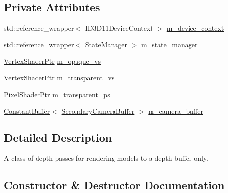 \subsection*{Private Attributes}
\begin{DoxyCompactItemize}
\item 
std\+::reference\+\_\+wrapper$<$ I\+D3\+D11\+Device\+Context $>$ \hyperlink{classmage_1_1rendering_1_1_depth_pass_a304b434841fb8a8b443df0e790630023}{m\+\_\+device\+\_\+context}
\item 
std\+::reference\+\_\+wrapper$<$ \hyperlink{classmage_1_1rendering_1_1_state_manager}{State\+Manager} $>$ \hyperlink{classmage_1_1rendering_1_1_depth_pass_a86c299c8b6ec689c83c60451fd988a35}{m\+\_\+state\+\_\+manager}
\item 
\hyperlink{namespacemage_1_1rendering_aaf704b9c54a4181f4950a1761de69dda}{Vertex\+Shader\+Ptr} \hyperlink{classmage_1_1rendering_1_1_depth_pass_a101f60b0363f79f9d349ea95e0efabe5}{m\+\_\+opaque\+\_\+vs}
\item 
\hyperlink{namespacemage_1_1rendering_aaf704b9c54a4181f4950a1761de69dda}{Vertex\+Shader\+Ptr} \hyperlink{classmage_1_1rendering_1_1_depth_pass_ab505e6b33ab449c2b7914d93e728eabb}{m\+\_\+transparent\+\_\+vs}
\item 
\hyperlink{namespacemage_1_1rendering_af03d922b228ee9c8542baaa2ecc9f259}{Pixel\+Shader\+Ptr} \hyperlink{classmage_1_1rendering_1_1_depth_pass_a6ef4d5064ab4cb485ae77cb230f90c6a}{m\+\_\+transparent\+\_\+ps}
\item 
\hyperlink{classmage_1_1rendering_1_1_constant_buffer}{Constant\+Buffer}$<$ \hyperlink{structmage_1_1rendering_1_1_secondary_camera_buffer}{Secondary\+Camera\+Buffer} $>$ \hyperlink{classmage_1_1rendering_1_1_depth_pass_aa4faded6ae9f01ea963379f6955d53ab}{m\+\_\+camera\+\_\+buffer}
\end{DoxyCompactItemize}


\subsection{Detailed Description}
A class of depth passes for rendering models to a depth buffer only. 

\subsection{Constructor \& Destructor Documentation}
\hypertarget{classmage_1_1rendering_1_1_depth_pass_a0be584f68a1a6b4d3b63616c449e903d}{}\label{classmage_1_1rendering_1_1_depth_pass_a0be584f68a1a6b4d3b63616c449e903d} 
